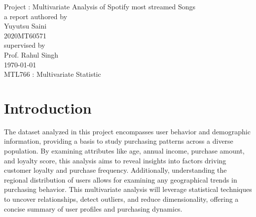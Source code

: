 \documentclass[11pt]{article}
\begin{document}
\begin{titlepage}

\centering
\vspace{7cm}
\huge Project : Multivariate Analysis of Spotify most streamed Songs\\ 
\vspace{2cm}
\Large a report authored by\\ 

\LARGE Yuyutsu Saini\\
\vspace{1mm}
\Large 2020MT60571\\
\vspace{2cm}
\Large supervised by\\
\Large Prof. Rahul Singh\\
\vspace{2cm}
\Large \today \\
\vspace{2cm}
\LARGE MTL766 : Multivariate Statistic

\end{titlepage}

\tableofcontents
\section{Introduction}

The dataset analyzed in this project encompasses user behavior and demographic information, providing a basis to study purchasing patterns across a diverse population. By examining attributes like age, annual income, purchase amount, and loyalty score, this analysis aims to reveal insights into factors driving customer loyalty and purchase frequency. Additionally, understanding the regional distribution of users allows for examining any geographical trends in purchasing behavior. This multivariate analysis will leverage statistical techniques to uncover relationships, detect outliers, and reduce dimensionality, offering a concise summary of user profiles and purchasing dynamics.
\end{document}
